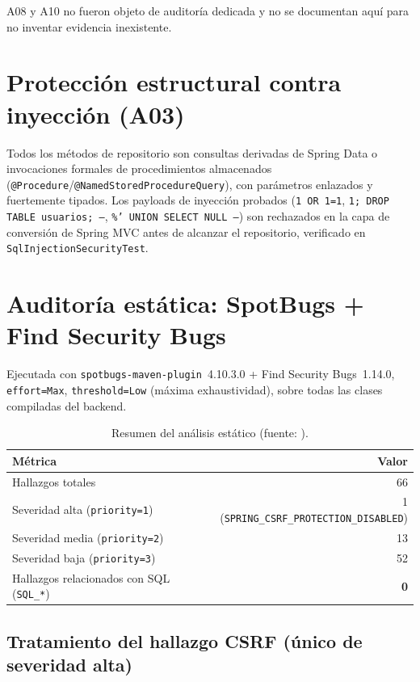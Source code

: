 A08 y A10 no fueron objeto de auditor\'ia dedicada y no se documentan aqu\'i
para no inventar evidencia inexistente.

\section{Protecci\'on estructural contra inyecci\'on (A03)}

Todos los m\'etodos de repositorio son consultas derivadas de Spring Data o
invocaciones formales de procedimientos almacenados
(\texttt{@Procedure}/\texttt{@NamedStoredProcedureQuery}), con par\'ametros
enlazados y fuertemente tipados. Los payloads de inyecci\'on probados
(\texttt{1 OR 1=1}, \texttt{1; DROP TABLE usuarios; --}, \texttt{\%' UNION
SELECT NULL --}) son rechazados en la capa de conversi\'on de Spring MVC
antes de alcanzar el repositorio, verificado en \texttt{SqlInjectionSecurityTest}.

\section{Auditor\'ia est\'atica: SpotBugs + Find Security Bugs}
\label{sec:spotbugs}

Ejecutada con \texttt{spotbugs-maven-plugin}~4.10.3.0 + Find Security
Bugs~1.14.0, \texttt{effort=Max}, \texttt{threshold=Low} (m\'axima
exhaustividad), sobre todas las clases compiladas del backend.

\begin{table}[H]
  \centering
  \caption{Resumen del an\'alisis est\'atico (fuente: ).}
  \label{tab:spotbugs-final}
  \begin{tabular}{@{}lr@{}}
    \toprule
    M\'etrica & Valor \\
    \midrule
    Hallazgos totales & 66 \\
    Severidad alta (\texttt{priority=1}) & 1 (\texttt{SPRING\_CSRF\_PROTECTION\_DISABLED}) \\
    Severidad media (\texttt{priority=2}) & 13 \\
    Severidad baja (\texttt{priority=3}) & 52 \\
    Hallazgos relacionados con SQL (\texttt{SQL\_*}) & \textbf{0} \\
    \bottomrule
  \end{tabular}
\end{table}

\subsection*{Tratamiento del hallazgo CSRF (\'unico de severidad alta)}
\label{sec:csrf}

